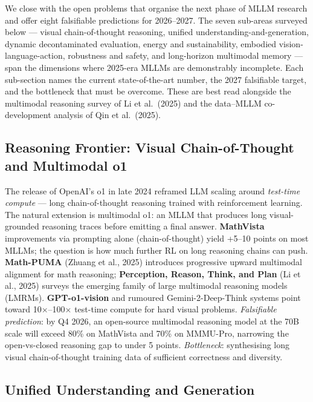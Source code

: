 We close with the open problems that organise the next phase of MLLM research and offer eight falsifiable predictions for 2026--2027. The seven sub-areas surveyed below --- visual chain-of-thought reasoning, unified understanding-and-generation, dynamic decontaminated evaluation, energy and sustainability, embodied vision-language-action, robustness and safety, and long-horizon multimodal memory --- span the dimensions where 2025-era MLLMs are demonstrably incomplete. Each sub-section names the current state-of-the-art number, the 2027 falsifiable target, and the bottleneck that must be overcome. These are best read alongside the multimodal reasoning survey of Li et al.~(2025) and the data--MLLM co-development analysis of Qin et al.~(2025).

\subsection{Reasoning Frontier: Visual Chain-of-Thought and Multimodal o1}\label{reasoning-frontier-visual-chain-of-thought-and-multimodal-o1}

The release of OpenAI's o1 in late 2024 reframed LLM scaling around \emph{test-time compute} --- long chain-of-thought reasoning trained with reinforcement learning. The natural extension is multimodal o1: an MLLM that produces long visual-grounded reasoning traces before emitting a final answer. \textbf{MathVista} improvements via prompting alone (chain-of-thought) yield +5--10 points on most MLLMs; the question is how much further RL on long reasoning chains can push. \textbf{Math-PUMA} (Zhuang et al., 2025) introduces progressive upward multimodal alignment for math reasoning; \textbf{Perception, Reason, Think, and Plan} (Li et al., 2025) surveys the emerging family of large multimodal reasoning models (LMRMs). \textbf{GPT-o1-vision} and rumoured Gemini-2-Deep-Think systems point toward 10×--100× test-time compute for hard visual problems. \emph{Falsifiable prediction}: by Q4 2026, an open-source multimodal reasoning model at the 70B scale will exceed 80\% on MathVista and 70\% on MMMU-Pro, narrowing the open-vs-closed reasoning gap to under 5 points. \emph{Bottleneck}: synthesising long visual chain-of-thought training data of sufficient correctness and diversity.

\subsection{Unified Understanding and Generation}\label{unified-understanding-and-generation}

